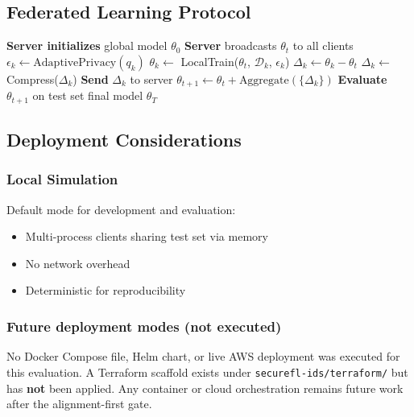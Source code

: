 \subsection{Federated Learning Protocol}

\begin{algorithm}
\caption{SecureFL-IDS Training Protocol}
\begin{algorithmic}
\STATE \textbf{Server initializes} global model $\theta_0$
    \STATE \textbf{Server} broadcasts $\theta_t$ to all clients
        \STATE $\epsilon_k \leftarrow \text{AdaptivePrivacy}(q_k)$ 
        \STATE $\theta_k \leftarrow$ LocalTrain($\theta_t$, $\mathcal{D}_k$, $\epsilon_k$)
        \STATE $\Delta_k \leftarrow \theta_k - \theta_t$
        \STATE $\Delta_k \leftarrow$ Compress($\Delta_k$) 
        \STATE \textbf{Send} $\Delta_k$ to server
    \ENDFOR
    \STATE $\theta_{t+1} \leftarrow \theta_t + \text{Aggregate}(\{\Delta_k\})$
    \STATE \textbf{Evaluate} $\theta_{t+1}$ on test set
\ENDFOR
\RETURN final model $\theta_T$
\end{algorithmic}
\end{algorithm}

\subsection{Deployment Considerations}

\subsubsection{Local Simulation}

Default mode for development and evaluation:
\begin{itemize}
    \item Multi-process clients sharing test set via memory
    \item No network overhead
    \item Deterministic for reproducibility
\end{itemize}

\subsubsection{Future deployment modes (not executed)}

No Docker Compose file, Helm chart, or live AWS deployment was executed for this evaluation. A Terraform scaffold exists under \texttt{securefl-ids/terraform/} but has \textbf{not} been applied. Any container or cloud orchestration remains future work after the alignment-first gate.

